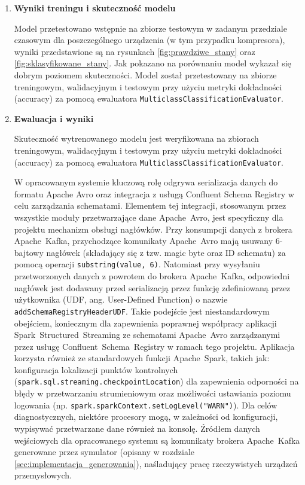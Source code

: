 \begin{enumerate}
    \item \textbf{Wyniki treningu i skuteczność modelu}

Model przetestowano wstępnie na zbiorze testowym w zadanym przedziale czasowym dla poszczególnego urządzenia (w tym przypadku kompresora), wyniki przedstawione są na rysunkach \ref{fig:prawdziwe_stany} oraz \ref{fig:sklasyfikowane_stany}. Jak pokazano na porównaniu model wykazał się dobrym poziomem skuteczności. Model został przetestowany na zbiorze treningowym, walidacyjnym i testowym przy użyciu metryki dokładności (accuracy) za pomocą ewaluatora \texttt{MulticlassClassificationEvaluator}. 


\label{fig:prawdziwe_stany}

\label{fig:sklasyfikowane_stany}

    \item \textbf{Ewaluacja i wyniki}

Skuteczność wytrenowanego modelu jest weryfikowana na zbiorach treningowym, walidacyjnym i testowym przy użyciu metryki dokładności (accuracy) za pomocą ewaluatora \texttt{MulticlassClassificationEvaluator}. 

W opracowanym systemie kluczową rolę odgrywa serializacja danych do formatu Apache Avro oraz integracja z usługą Confluent Schema Registry w celu zarządzania schematami. Elementem tej integracji, stosowanym przez wszystkie moduły przetwarzające dane \mbox{Apache Avro}, jest specyficzny dla projektu mechanizm obsługi nagłówków. Przy konsumpcji danych z brokera \mbox{Apache Kafka}, przychodzące komunikaty \mbox{Apache Avro} mają usuwany 6-bajtowy nagłówek (składający się z tzw. magic byte oraz ID schematu) za pomocą operacji \texttt{substring(value, 6)}. Natomiast przy wysyłaniu przetworzonych danych z powrotem do brokera \mbox{Apache Kafka}, odpowiedni nagłówek jest dodawany przed serializacją przez funkcję zdefiniowaną przez użytkownika (UDF, ang. User-Defined Function) \cite{spark_udf} o nazwie \texttt{addSchemaRegistryHeaderUDF}. Takie podejście jest niestandardowym obejściem, koniecznym dla zapewnienia poprawnej współpracy aplikacji \mbox{Spark Structured Streaming} ze schematami \mbox{Apache Avro} zarządzanymi przez usługę \mbox{Confluent Schema Registry} \cite{confluent_schema_registry} w ramach tego projektu. Aplikacja korzysta również ze standardowych funkcji \mbox{Apache Spark}, takich jak: konfiguracja lokalizacji punktów kontrolnych (\texttt{spark.sql.streaming.checkpointLocation}) dla zapewnienia odporności na błędy w przetwarzaniu strumieniowym oraz możliwości ustawiania poziomu logowania (np. \texttt{spark.sparkContext.setLogLevel("WARN")}). Dla celów diagnostycznych, niektóre procesory mogą, w zależności od konfiguracji, wypisywać przetwarzane dane również na konsolę. Źródłem danych wejściowych dla opracowanego systemu są komunikaty brokera \mbox{Apache Kafka} generowane przez symulator (opisany w rozdziale \ref{sec:implementacja_generowania}), naśladujący pracę rzeczywistych urządzeń przemysłowych.

\end{enumerate}